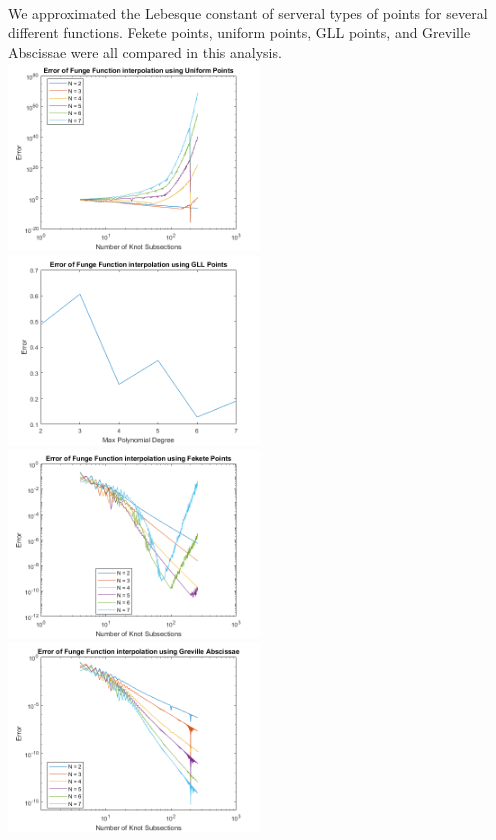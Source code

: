 \documentclass{article}
\begin{document}
\paragraph{}
We approximated the Lebesque constant of serveral types of points for several different functions. Fekete points, uniform points, GLL points, and Greville Abscissae were all compared in this analysis.
\newline
\includegraphics[height = 5cm]{Uniform.png} \includegraphics[height = 5cm]{GLL.png}
\includegraphics[height = 5cm]{Fekete.png} \includegraphics[height = 5cm]{Greville.png}
\end{document}
